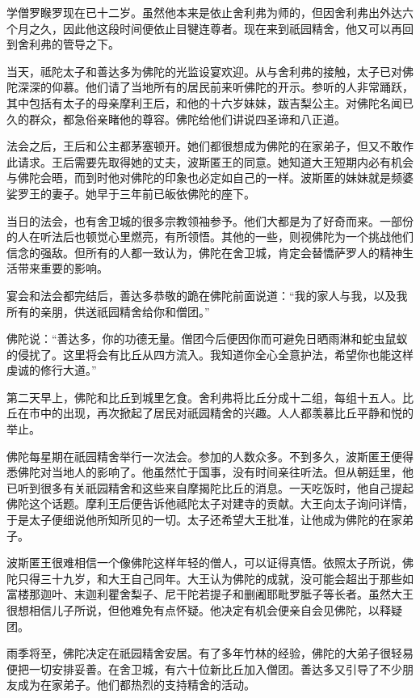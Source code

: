 \documentclass[12pt,twoside,openany]{book}
\begin{document}
学僧罗睺罗现在已十二岁。虽然他本来是依止舍利弗为师的，但因舍利弗出外达六个月之久，因此他这段时间便依止目犍连尊者。现在来到祇园精舍，他又可以再回到舍利弗的管导之下。

当天，祗陀太子和善达多为佛陀的光监设宴欢迎。从与舍利弗的接触，太子已对佛陀深深的仰慕。他们请了当地所有的居民前来听佛陀的开示。参听的人非常踊跃，其中包括有太子的母亲摩利王后，和他的十六岁妹妹，跋吉梨公主。对佛陀名闻已久的群众，都急俗亲睹他的尊容。佛陀给他们讲说四圣谛和八正道。

法会之后，王后和公主都茅塞顿开。她们都很想成为佛陀的在家弟子，但又不敢作此请求。王后需要先取得她的丈夫，波斯匿王的同意。她知道大王短期内必有机会与佛陀会晤，而到时他对佛陀的印象也必定如自己的一样。波斯匿的妹妹就是频婆娑罗王的妻子。她早于三年前已皈依佛陀的座下。

当日的法会，也有舍卫城的很多宗教领袖参予。他们大都是为了好奇而来。一部份的人在听法后也顿觉心里燃亮，有所领悟。其他的一些，则视佛陀为一个挑战他们信念的强敌。但所有的人都一致认为，佛陀在舍卫城，肯定会替憍萨罗人的精神生活带来重要的影响。

宴会和法会都完结后，善达多恭敬的跪在佛陀前面说道：“我的家人与我，以及我所有的亲朋，供送祇园精舍给你和僧团。”

佛陀说：“善达多，你的功德无量。僧团今后便因你而可避免日晒雨淋和蛇虫鼠蚁的侵扰了。这里将会有比丘从四方流入。我知道你全心全意护法，希望你也能这样虔诚的修行大道。”

第二天早上，佛陀和比丘到城里乞食。舍利弗将比丘分成十二组，每组十五人。比丘在市中的出现，再次掀起了居民对祇园精舍的兴趣。人人都羡慕比丘平静和悦的举止。

佛陀每星期在祇园精舍举行一次法会。参加的人数众多。不到多久，波斯匿王便得悉佛陀对当地人的影响了。他虽然忙于国事，没有时间亲往听法。但从朝廷里，他已听到很多有关祇园精舍和这些来自摩揭陀比丘的消息。一天吃饭时，他自己提起佛陀这个话题。摩利王后便告诉他祗陀太子对建寺的贡献。大王向太子询问详情，于是太子便细说他所知所见的一切。太子还希望大王批准，让他成为佛陀的在家弟子。

波斯匿王很难相信一个像佛陀这样年轻的僧人，可以证得真悟。依照太子所说，佛陀只得三十九岁，和大王自己同年。大王认为佛陀的成就，没可能会超出于那些如富楼那迦叶、末迦利瞿舍梨子、尼干陀若提子和删阇耶毗罗胝子等长者。虽然大王很想相信儿子所说，但他难免有点怀疑。他决定有机会便亲自会见佛陀，以释疑团。

雨季将至，佛陀决定在祇园精舍安居。有了多年竹林的经验，佛陀的大弟子很轻易便把一切安排妥善。在舍卫城，有六十位新比丘加入僧团。善达多又引导了不少朋友成为在家弟子。他们都热烈的支持精舍的活动。
\end{document}

